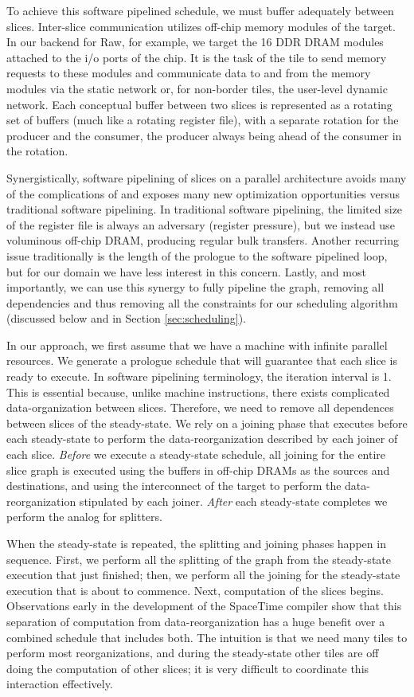 To achieve this software pipelined schedule, we must buffer adequately
between slices.  Inter-slice communication utilizes off-chip memory
modules of the target.  In our backend for Raw, for example, we target
the 16 DDR DRAM modules attached to the i/o ports of the chip.  It is
the task of the tile to send memory requests to these modules and
communicate data to and from the memory modules via the static network
or, for non-border tiles, the user-level dynamic network.  Each
conceptual buffer between two slices is represented as a rotating set
of buffers (much like a rotating register file), with a separate
rotation for the producer and the consumer, the producer
always being ahead of the consumer in the rotation.

Synergistically, software pipelining of slices on a parallel
architecture avoids many of the complications of and exposes many new
optimization opportunities versus traditional software pipelining.  In
traditional software pipelining, the limited size of the register file
is always an adversary (register pressure), but we instead use
voluminous off-chip DRAM, producing regular bulk transfers.  Another
recurring issue traditionally is the length of the prologue to the
software pipelined loop, but for our domain we have less interest in
this concern.  Lastly, and most importantly, we can use this synergy
to fully pipeline the graph, removing all dependencies and thus
removing all the constraints for our scheduling algorithm (discussed
below and in Section \ref{sec:scheduling}).

In our approach, we first assume that we have a machine with infinite
parallel resources.  We generate a prologue schedule that will
guarantee that each slice is ready to execute.  In software pipelining
terminology, the iteration interval is 1.  This is essential because,
unlike machine instructions, there exists complicated
data-organization between slices.  Therefore, we need to remove all
dependences between slices of the steady-state.  We rely on a joining
phase that executes before each steady-state to perform the
data-reorganization described by each joiner of each slice.  {\it
Before} we execute a steady-state schedule, all joining for the entire
slice graph is executed using the buffers in off-chip DRAMs as the
sources and destinations, and using the interconnect of the target to
perform the data-reorganization stipulated by each joiner.  {\it
After} each steady-state completes we perform the analog for
splitters.

When the steady-state is repeated, the splitting and joining phases
happen in sequence.  First, we perform all the splitting of the graph
from the steady-state execution that just finished; then, we perform
all the joining for the steady-state execution that is about to
commence. Next, computation of the slices begins.  Observations early
in the development of the SpaceTime compiler show that this separation
of computation from data-reorganization has a huge benefit over a
combined schedule that includes both.  The intuition is that we need
many tiles to perform most reorganizations, and during the
steady-state other tiles are off doing the computation of other
slices; it is very difficult to coordinate this interaction
effectively.

